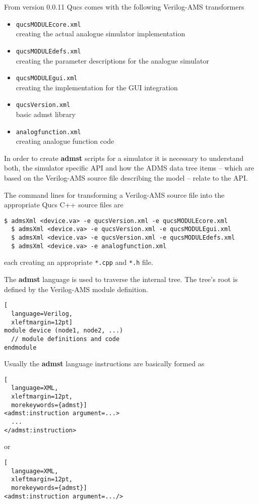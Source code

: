 From version 0.0.11 Qucs comes with the following Verilog-AMS
transformers
\begin{itemize}
\item \verb+qucsMODULEcore.xml+\\
creating the actual analogue simulator implementation
\item \verb+qucsMODULEdefs.xml+\\
creating the parameter descriptions for the analogue simulator
\item \verb+qucsMODULEgui.xml+\\
creating the implementation for the GUI integration
\item \verb+qucsVersion.xml+\\
basic admst library
\item \verb+analogfunction.xml+\\
creating analogue function code
\end{itemize}

In order to create \textbf{admst} scripts for a simulator it is
necessary to understand both, the simulator specific API and how the
ADMS data tree items -- which are based on the Verilog-AMS source file
describing the model -- relate to the API.

\addvspace{12pt}

The command lines for transforming a Verilog-AMS source file into the
appropriate Qucs C++ source files are
\begin{Verbatim}[fontsize=\small]
  $ admsXml <device.va> -e qucsVersion.xml -e qucsMODULEcore.xml
  $ admsXml <device.va> -e qucsVersion.xml -e qucsMODULEgui.xml
  $ admsXml <device.va> -e qucsVersion.xml -e qucsMODULEdefs.xml
  $ admsXml <device.va> -e analogfunction.xml
\end{Verbatim}

each creating an appropriate \verb+*.cpp+ and \verb+*.h+ file.

\addvspace{12pt}

The \textbf{admst} language is used to traverse the internal tree.
The tree's root is defined by the Verilog-AMS module definition.
\begin{lstlisting}[
  language=Verilog,
  xleftmargin=12pt]
module device (node1, node2, ...)
  // module definitions and code
endmodule
\end{lstlisting}


Usually the \textbf{admst} language instructions are basically formed
as
\begin{lstlisting}[
  language=XML,
  xleftmargin=12pt,
  morekeywords={admst}]
<admst:instruction argument=...>
  ...
</admst:instruction>
\end{lstlisting}
or
\begin{lstlisting}[
  language=XML,
  xleftmargin=12pt,
  morekeywords={admst}]
<admst:instruction argument=.../>
\end{lstlisting}

